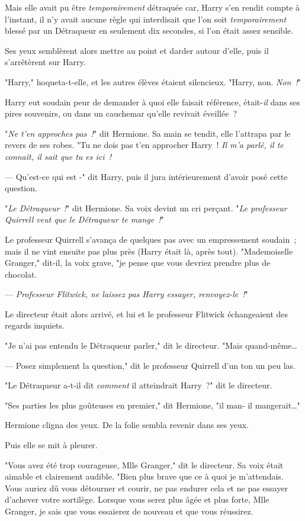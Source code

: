 Mais elle avait pu être \emph{temporairement} détraquée car, Harry s'en rendit compte à l'instant, il n'y avait aucune règle qui interdisait que l'on soit \emph{temporairement} blessé par un Détraqueur en seulement dix secondes, si l'on était assez sensible.

Ses yeux semblèrent alors mettre au point et darder autour d'elle, puis il s'arrêtèrent sur Harry.

"Harry," hoqueta-t-elle, et les autres élèves étaient silencieux. "Harry, non. \emph{Non~!}"

Harry eut soudain peur de demander à quoi elle faisait référence, était-\emph{il} dans ses pires souvenirs, ou dans un cauchemar qu'elle revivait éveillée~?

"\emph{Ne t'en approches pas~!}" dit Hermione. Sa main se tendit, elle l'attrapa par le revers de ses robes. "Tu ne dois pas t'en approcher Harry~! \emph{Il m'a parlé, il te connaît, il sait que tu es ici~!}

--- Qu'est-ce qui est -" dit Harry, puis il jura intérieurement d'avoir posé cette question.

"\emph{Le Détraqueur~!}" dit Hermione. Sa voix devint un cri perçant. "\emph{Le professeur Quirrell veut que le Détraqueur te mange~!}"

Le professeur Quirrell s'avança de quelques pas avec un empressement soudain~; mais il ne vint ensuite pas plus près (Harry était là, après tout). "Mademoiselle Granger," dit-il, la voix grave, "je pense que vous devriez prendre plus de chocolat.

--- \emph{Professeur Flitwick, ne laissez pas Harry essayer, renvoyez-le~!}"

Le directeur était alors arrivé, et lui et le professeur Flitwick échangeaient des regards inquiets.

"Je n'ai pas entendu le Détraqueur parler," dit le directeur. "Mais quand-même…

--- Posez simplement la question," dit le professeur Quirrell d'un ton un peu las.

"Le Détraqueur a-t-il dit \emph{comment} il atteindrait Harry~?" dit le directeur.

"Ses parties les plus goûteuses en premier," dit Hermione, "il man- il mangerait…"

Hermione cligna des yeux. De la folie sembla revenir dans ses yeux.

Puis elle se mit à pleurer.

"Vous avez été trop courageuse, Mlle Granger," dit le directeur. Sa voix était aimable et clairement audible. "Bien plus brave que ce à quoi je m'attendais. Vous auriez dû vous détourner et courir, ne pas endurer cela et ne pas essayer d'achever votre sortilège. Lorsque vous serez plus âgée et plus forte, Mlle Granger, je sais que vous essaierez de nouveau et que vous réussirez.

